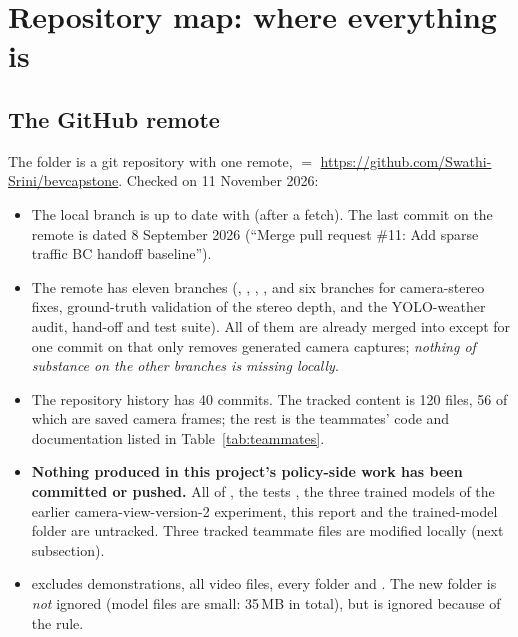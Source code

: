 \section{Repository map: where everything is}\label{sec:repomap}

\subsection{The GitHub remote}
The folder  is a git repository with one remote,  $=$ \url{https://github.com/Swathi-Srini/bevcapstone}. Checked on 11 November 2026:
\begin{itemize}
\item The local branch  is up to date with  (after a fetch). The last commit on the remote is dated 8 September 2026 (``Merge pull request \#11: Add sparse traffic BC handoff baseline'').
\item The remote has eleven branches (, , , , and six  branches for camera-stereo fixes, ground-truth validation of the stereo depth, and the YOLO-weather audit, hand-off and test suite).
  All of them are already merged into  except for one commit on  that only removes generated camera captures; \emph{nothing of substance on the other branches is missing locally}.
\item The repository history has 40 commits. The tracked content is 120 files, 56 of which are saved camera frames; the rest is the teammates' code and documentation listed in Table~\ref{tab:teammates}.
\item \textbf{Nothing produced in this project's policy-side work has been committed or pushed.} All of , the tests , the three trained models of the earlier camera-view-version-2 experiment, this report and the trained-model folder are untracked. Three tracked teammate files are modified locally (next subsection).
\item {} excludes  demonstrations, all video files, every  folder and . The new folder  is \emph{not} ignored (model files are small: 35\,MB in total), but  is ignored because of the  rule.
\end{itemize}

